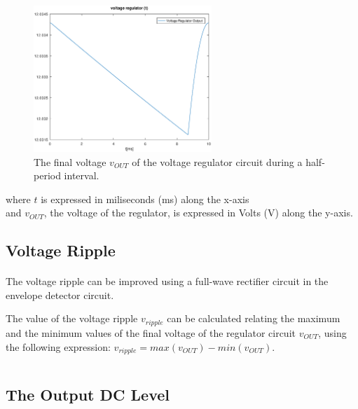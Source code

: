 \begin{figure}[H] \centering
\includegraphics[width=0.6\textwidth]{output.eps}
\caption{The final voltage $v_{OUT}$ of the voltage regulator circuit during a half-period interval.}
\label{fig:output}
\end{figure}

where $t$ is expressed in miliseconds (ms) along the x-axis\\
and $v_{OUT}$, the voltage of the regulator, is expressed in Volts (V) along the y-axis.

\subsection{Voltage Ripple}
\label{subsec:ripple}

\paragraph{}
The voltage ripple can be improved using a full-wave rectifier circuit in the envelope detector circuit. 

The value of the voltage ripple $v_{ripple}$ can be calculated relating the maximum and the minimum values of the final voltage of the regulator circuit $v_{OUT}$, using the following expression: $v_{ripple}=max(v_{OUT})-min(v_{OUT})$.

\begin{center}
   \begin{tabular}{|c||c|}
      \hline
        
   \end{tabular}
 \end{center}

\subsection{The Output DC Level}
\label{subsec:dclevel}

